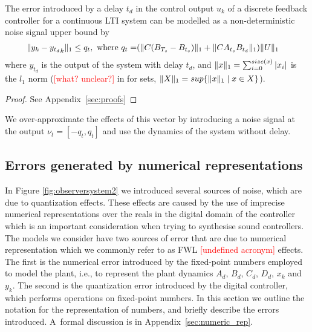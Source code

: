 \documentclass[sigconf]{llncs}
\DeclarePairedDelimiter\norm{\lVert}{\rVert}
\newcommand{\mat}[1]{{#1}}
\renewcommand{\vec}[1]{{#1}}
\renewcommand{\note}[1]{\textcolor{red}{[#1]}}
\begin{document}
\begin{theorem}
The error introduced by a delay $t_d$ in the control output $\vec{u}_k$ of a discrete feedback controller for a continuous LTI system can be modelled as a non-deterministic noise signal upper bound by 
\begin{align}
\norm{\vec{y}_{k}-{\vec{y}_{t_d}}_{k}}_1 \leq q_t, \text{ where } q_t=&(\norm{\mat{C}(\mat{B}_{T_s}-\mat{B}_{t_s})}_1+\norm{\mat{C}\mat{A}_{t_s}\mat{B}_{t_d}}_1)\norm{U}_1
\end{align}
where $\vec{y}_{t_d}$ is the output of the system with delay $t_d$, and $\norm{\vec{x}}_1=\sum_{i=0}^{size(\vec{x})} |\vec{x}_i|$ is the $l_1$ norm (\note{what? unclear?} in for sets, $\norm{X}_1 = sup \{\norm{\vec{x}}_1 \mid \vec{x} \in X\}$). 
\end{theorem}

\begin{proof}
See Appendix~\ref{sec:proofs}
\end{proof}
We over-approximate the effects of this vector by introducing a noise signal at the output $\nu_t=[-q_t, q_t]$ and use the dynamics of the system without delay.

\subsection{Errors generated by numerical representations} 
\label{sec:numeric_rep2}

In Figure \ref{fig:observersystem2} we introduced several sources of noise,
which are due to quantization effects.  These effects are caused by the use
of imprecise numerical representations over the reals in the digital domain
of the controller which is an important consideration when trying to synthesise
sound controllers.
The models we consider have two sources of error that are due to numerical  
representation which we commonly refer to as FWL \note{undefined acronym} effects.
The first is the numerical error introduced by the
fixed-point numbers employed to model the plant, i.e., to represent the
plant dynamics $A_d$, $B_d$, $C_d$, $D_d$, $x_k$ and $y_k$.
The second is the quantization error
introduced by the digital controller, which performs operations on
fixed-point numbers.  In this section we outline the notation for the
representation of numbers, and briefly describe the errors
introduced.  A~formal discussion is in
Appendix~\ref{sec:numeric_rep}.
\end{document}
